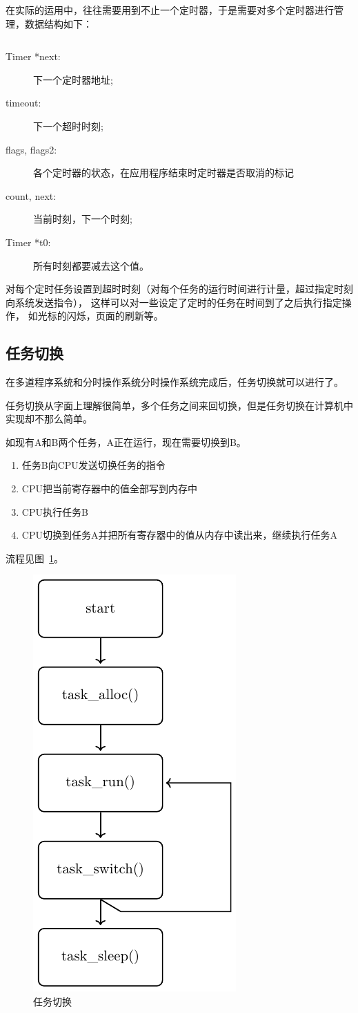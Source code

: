 在实际的运用中，往往需要用到不止一个定时器，于是需要对多个定时器进行管理，数据结构如下：

\begin{listing}[H]
  \inputminted[tabsize=2, firstline=175, lastline=187,
    linenos=true]{c}{../ZOS/src/kernel/bootpack.h}
  \caption{数据结构-多定时器}
  \label{lst:multi_timer}
\end{listing}

\begin{description}
\item[Timer *next:]下一个定时器地址;
\item[timeout:]下一个超时时刻;
\item[flags, flags2:]各个定时器的状态，在应用程序结束时定时器是否取消的标记
\item[count, next:]当前时刻，下一个时刻;
\item[Timer *t0:]所有时刻都要减去这个值。
\end{description}

对每个定时任务设置到超时时刻（对每个任务的运行时间进行计量，超过指定时刻向系统发送指令），
这样可以对一些设定了定时的任务在时间到了之后执行指定操作，
如光标的闪烁，页面的刷新等。

\subsection{任务切换}

在多道程序系统和分时操作系统分时操作系统完成后，任务切换就可以进行了。

任务切换从字面上理解很简单，多个任务之间来回切换，但是任务切换在计算机中实现却不那么简单。

如现有A和B两个任务，A正在运行，现在需要切换到B。
\begin{enumerate}
\item 任务B向CPU发送切换任务的指令
\item CPU把当前寄存器中的值全部写到内存中
\item CPU执行任务B
\item CPU切换到任务A并把所有寄存器中的值从内存中读出来，继续执行任务A
\end{enumerate}
流程见图~\ref{fig:tasksw}。
\begin{figure}[H]
  \centering
  \includegraphics[width=.2\textwidth]{fig/func/multi.pdf}
  \caption{任务切换}
  \label{fig:tasksw}
\end{figure}

